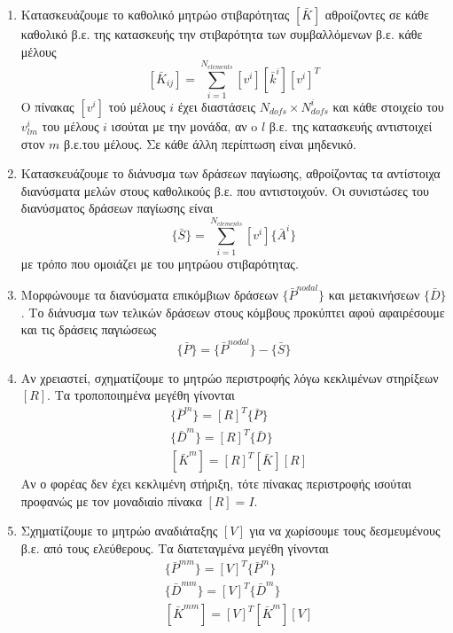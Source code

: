 \documentclass[a4paper, twocolumn]{article}
\newcommand{\num}[1]{ N_{\mathit{#1}} }
\newcommand{\vect}[1]{ \{ #1\} }
\newcommand{\mat}[1]{\left[ #1 \right]}
\newcommand{\gstiff}[1]{\mat{\bar{k}^{\mathit{#1}}}}
\newcommand{\Gstiff}[1]{\mat{\bar{K}^{\mathit{#1}}}}
\newcommand{\gforce}[1]{\vect{\bar{P}^{\mathit{#1}}}}
\newcommand{\gdisp}[1]{\vect{\bar{D}^{\mathit{#1}}}}
\newcommand{\subk}[1]{ \mat{\bar{K}_{\mathit{#1}}} }
\begin{document}
\begin{enumerate}
	\item Kατασκευάζουμε το καθολικό μητρώο στιβαρότητας $\Gstiff{}$
	 αθροίζοντες σε κάθε καθολικό β.ε. της κατασκευής την στιβαρότητα 
	 των συμβαλλόμενων β.ε. κάθε μέλους
	\begin{equation}
		\subk{ij} = \sum_{i=1}^{\num{elements}} \mat{v^i} \gstiff{i} 
		\mat{v^i}^T
	\end{equation}
	O πίνακας $\mat{v^i}$ τού μέλους $i$ έχει διαστάσεις $\num{dofs} 
	\times \num{dofs}^i$ και κάθε στοιχείο του $v^i_{\mathit{lm}}$ 
	του μέλους $i$ ισούται με την 
	μονάδα, αν o $l$ β.ε. της κατασκευής αντιστοιχεί στον $m$ β.ε.του 
	μέλους. Σε κάθε άλλη περίπτωση είναι μηδενικό.
	
	\item Κατασκευάζουμε το διάνυσμα των δράσεων παγίωσης, 
	αθροίζοντας τα αντίστοιχα διανύσματα μελών στους καθολικούς β.ε. 
	που αντιστοιχούν. Οι συνιστώσες του διανύσματος δράσεων παγίωσης 
	είναι
	\begin{equation}
		\vect{\bar S} = \sum_{i=1}^{\num{elements}} \mat{v^i} 
		\vect{\bar{A}^i}
	\end{equation}
	με τρόπο που ομοιάζει με του μητρώου στιβαρότητας.
	
	\item Μορφώνουμε τα διανύσματα επικόμβιων δράσεων $\vect{\bar 
	P^{\mathit{nodal}}}$ και μετακινήσεων $\vect{\bar D}$. Το 
	διάνυσμα 
	των
	τελικών δράσεων στους κόμβους προκύπτει αφού αφαιρέσουμε και τις 
	δράσεις παγιώσεως
	\begin{equation}
		\vect{\bar P} = \vect{\bar P^{\mathit{nodal}}} - \vect{\bar S}
	\end{equation}
	\item Αν χρειαστεί, σχηματίζουμε το μητρώο περιστροφής λόγω 
	κεκλιμένων στηρίξεων $\mat{R}$. Τα τροποποιημένα μεγέθη γίνονται
	\begin{align}
		&\gforce{m} = \mat{R}^T \gforce{} \\
		&\gdisp{m} = \mat{R}^T \gdisp{} \\
		&\Gstiff{m} = \mat{R}^T \Gstiff{} \mat{R}
	\end{align}
	Αν ο φορέας δεν έχει κεκλιμένη στήριξη, τότε πίνακας περιστροφής 
	ισούται προφανώς με τον μοναδιαίο πίνακα $\mat{R}=I$.
	
	\item Σχηματίζουμε το μητρώο αναδιάταξης $\mat{V}$ για να 
	χωρίσουμε τους δεσμευμένους β.ε. από τους ελεύθερους. Τα 
	διατεταγμένα μεγέθη γίνονται
	\begin{align}
		&\gforce{mm} = \mat{V}^T \gforce{m} \\
		&\gdisp{mm} = \mat{V}^T \gdisp{m} \\
		&\Gstiff{mm} = \mat{V}^T \Gstiff{m} \mat{V} 
	\end{align}
\end{enumerate}
\end{document}
